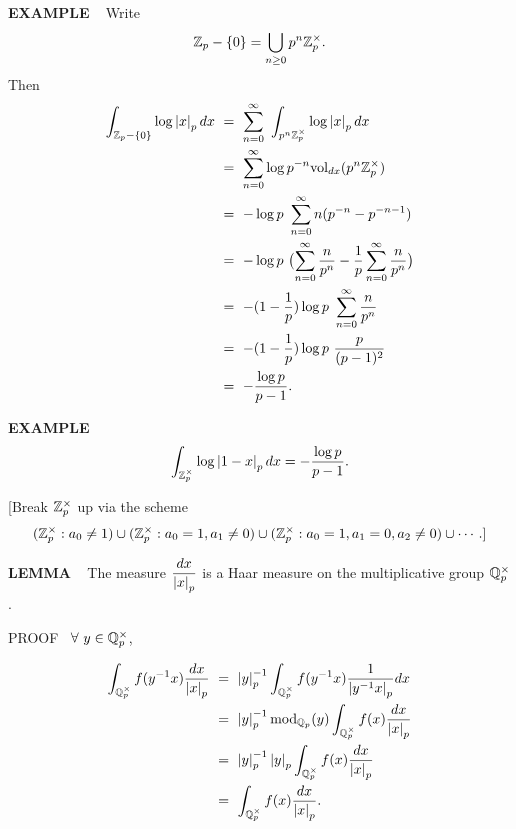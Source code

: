 \vspace{0.1cm}

\begin{x}{\small\bf EXAMPLE}  \ %
Write
\[
\mathbb{Z}_p - \{0\} = \bigcup\limits_{n \ge 0}p^n \mathbb{Z}_p^\times.
\]
Then
\begin{align*}
\allowdisplaybreaks
\int_{\Z_p - \{0\}} \log \abs{x}_p dx \ 
&= \ \sum_{n=0}^\infty \  \int_{p^n \Z_p^\times} \log \abs{x}_p dx\\
&= \ \sum_{n=0}^\infty \log p^{-n} \vol_{dx}(p^n\Z_p^\times)\\
&= \ -\log p \ \sum_{n=0}^\infty n(p^{-n} - p^{-n-1})\\
&= \ -\log p \  \bigl(\sum_{n=0}^\infty \frac{n}{p^n} - \frac{1}{p} \sum_{n=0}^\infty \frac{n}{p^n}\bigr)\\
&= \ - (1 - \frac{1}{p}) \log p \ \sum_{n=0}^\infty \frac{n}{p^n} \\
&= \ - (1 - \frac{1}{p}) \log p \ \frac{p}{(p-1)^2}\\
&= \ - \frac{\log p}{p-1}.
\end{align*}
\end{x}


\begin{x}{\small\bf EXAMPLE}   \ %
\[
\int_{\mathbb{Z}_p^\times} \log \left\vert1 - x\right\vert_p dx = -\frac{\log p}{p-1}.
\]

[Break $\mathbb{Z}_p^\times$ up via the scheme
\[
(\mathbb{Z}_p^\times:a_0 \ne 1) \cup (\mathbb{Z}_p^\times:a_0 = 1, a_1 \ne 0) \cup (\mathbb{Z}_p^\times:a_0 = 1, a_1 = 0, a_2 \ne 0) \cup \dotsb .]
\]
\end{x}



\begin{x}{\small\bf LEMMA} \ %
The measure $\displaystyle\frac{dx}{\left\vert x\right\vert_p}$ is a Haar measure on the multiplicative group $\mathbb{Q}_p^\times$.


PROOF \  $\forall \  y \in \mathbb{Q}_p^\times$,

\allowdisplaybreaks
\begin{align*}
\allowdisplaybreaks
\int_{\Q_p^\times} f(y^{-1}x) \frac{dx}{\abs{x}_p} \ 
&= \ \abs{y}_p^{-1} \int_{\Q_p^\times} f(y^{-1}x) \frac{1}{\abs{y^{-1}x}_p} dx\\
&= \ \abs{y}_p^{-1} \modxs_{\Q_p}(y) \int_{\Q_p^\times} f(x) \frac{dx}{\abs{x}_p}\\
&= \ \abs{y}_p^{-1} \abs{y}_p \int_{\Q_p^\times} f(x) \frac{dx}{\abs{x}_p}\\
&= \ \int_{\Q_p^\times} f(x) \frac{dx}{\abs{x}_p}.
\end{align*}
\end{x}
\vspace{0.1cm}

